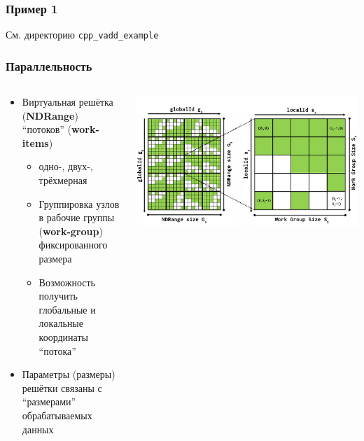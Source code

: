 \documentclass[
    aspectratio=169,
]{beamer}
\begin{document}
\begin{frame}
    \frametitle{Пример 1}

    См. директорию \texttt{cpp\_vadd\_example}

\end{frame}

\begin{frame}
    \frametitle{Параллельность}

    \begin{columns}[T]
        \begin{column}{0.5\textwidth}
            \begin{itemize}
                \item Виртуальная решётка (\textbf{NDRange}) \enquote{потоков} (\textbf{work-items})
                      \begin{itemize}
                          \item одно-, двух-, трёхмерная
                          \item Группировка узлов в рабочие группы (\textbf{work-group}) фиксированного размера
                          \item Возможность получить глобальные и локальные координаты \enquote{потока}
                      \end{itemize}
                \item Параметры (размеры) решётки связаны с \enquote{размерами} обрабатываемых данных
            \end{itemize}
        \end{column}
        \begin{column}{0.5\textwidth}
            \includegraphics[width=\linewidth]{opeclmap4.png}
        \end{column}
    \end{columns}

\end{frame}
\end{document}
